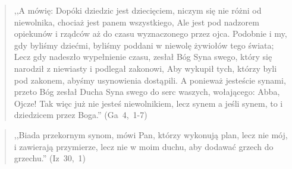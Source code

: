 \documentclass[10pt,a4paper,oneside]{article}
\begin{document}
\begin{quote}
,,A mówię: Dopóki dziedzic jest dziecięciem, niczym się nie różni od niewolnika, chociaż jest panem wszystkiego, Ale jest pod nadzorem opiekunów i rządców aż do czasu wyznaczonego przez ojca. Podobnie i my, gdy byliśmy dziećmi, byliśmy poddani w niewolę żywiołów tego świata; Lecz gdy nadeszło wypełnienie czasu, zesłał Bóg Syna swego, który się narodził z niewiasty i podlegał zakonowi, Aby wykupił tych, którzy byli pod zakonem, abyśmy usynowienia dostąpili. A ponieważ jesteście synami, przeto Bóg zesłał Ducha Syna swego do serc waszych, wołającego: Abba, Ojcze! Tak więc już nie jesteś niewolnikiem, lecz synem a jeśli synem, to i dziedzicem przez Boga.'' \mbox{(Ga 4, 1-7)}
\end{quote}
\begin{quote}
,,Biada przekornym synom, mówi Pan, którzy wykonują plan, lecz nie mój, i zawierają przymierze, lecz nie w moim duchu, aby dodawać grzech do grzechu.'' \mbox{(Iz 30, 1)}
\end{quote}
\end{document}
